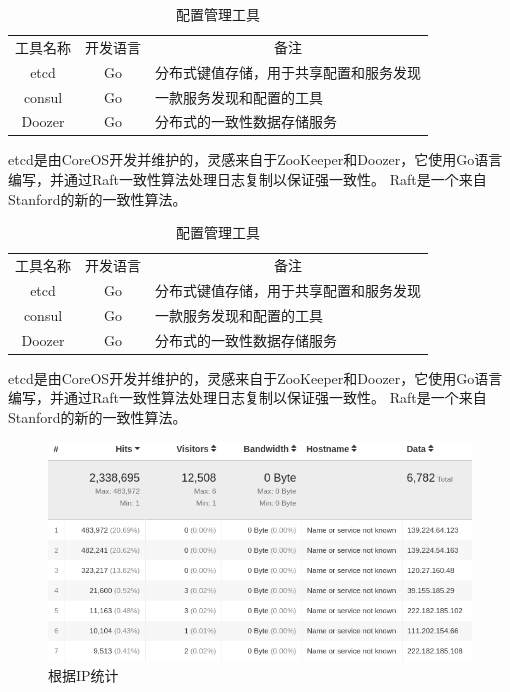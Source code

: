 \documentclass[8pt]{book}
\numberwithin{dummy}{section}
\theoremstyle{ocrenumbox}
\theoremstyle{blacknumex}
\theoremstyle{blacknumbox}
\theoremstyle{ocrenum}
\begin{document}
\begin{table}[htbp]
	\caption{配置管理工具}
	\label{table:configmanagementtool}
	\begin{center}
		\begin{tabular}{|c|c|p{8cm}|}
			\hline
			\multirow{1}{*}{工具名称}
			& \multicolumn{1}{c|}{开发语言} 
			& \multicolumn{1}{c|}{备注}\\			
			\cline{1-3}
			etcd &  Go  & 分布式键值存储，用于共享配置和服务发现 \\
			\hline
			consul & Go &  一款服务发现和配置的工具 \\
			\hline
			Doozer & Go & 分布式的一致性数据存储服务 \\
			\hline							
		\end{tabular}	
	\end{center}
\end{table}

etcd是由CoreOS开发并维护的，灵感来自于ZooKeeper和Doozer，它使用Go语言编写，并通过Raft一致性算法处理日志复制以保证强一致性。 Raft是一个来自Stanford的新的一致性算法。


\begin{table}[htbp]
	\caption{配置管理工具}
	\label{table:configmanagementtool}
	\begin{center}
		\begin{tabular}{|c|c|p{8cm}|}
			\hline
			\multirow{1}{*}{工具名称}
			& \multicolumn{1}{c|}{开发语言} 
			& \multicolumn{1}{c|}{备注}\\			
			\cline{1-3}
			etcd &  Go  & 分布式键值存储，用于共享配置和服务发现 \\
			\hline
			consul & Go &  一款服务发现和配置的工具 \\
			\hline
			Doozer & Go & 分布式的一致性数据存储服务 \\
			\hline							
		\end{tabular}	
	\end{center}
\end{table}

etcd是由CoreOS开发并维护的，灵感来自于ZooKeeper和Doozer，它使用Go语言编写，并通过Raft一致性算法处理日志复制以保证强一致性。 Raft是一个来自Stanford的新的一致性算法。



\begin{figure}[htbp]
	\centering
	\includegraphics[scale=0.4]{ipstatistics.png}
	\caption{根据IP统计}
	\label{fig:ipstatistics}
\end{figure}
\end{document}
